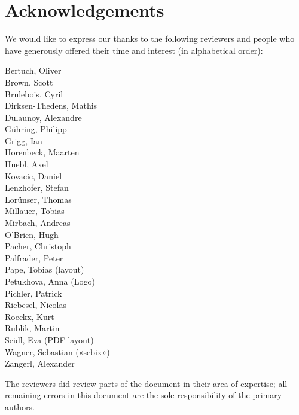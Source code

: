 \clearpage
\section*{Acknowledgements}
\label{section:Reviewers}

We would like to express our thanks to the following reviewers and people who have generously offered their time and interest (in alphabetical order):

\begin{multicols}{2}{\parskip=0pt\centering\obeylines%
Bertuch, Oliver \\
Brown, Scott \\
Brulebois, Cyril \\
Dirksen-Thedens, Mathis \\
Dulaunoy, Alexandre \\
Gühring, Philipp  \\
Grigg, Ian  \\
Horenbeck, Maarten \\
Huebl, Axel \\
Kovacic, Daniel \\
Lenzhofer, Stefan \\
Lorünser, Thomas \\
Millauer, Tobias \\
Mirbach, Andreas \\ 
O'Brien, Hugh \\
Pacher, Christoph \\
Palfrader, Peter \\
Pape, Tobias (layout) \\
Petukhova, Anna (Logo) \\
Pichler, Patrick \\
Riebesel, Nicolas \\
Roeckx, Kurt \\
Rublik, Martin \\
Seidl, Eva (PDF layout) \\
Wagner, Sebastian («sebix») \\
Zangerl, Alexander \\
}\end{multicols}





The reviewers did review parts of the document in their area of
expertise; all remaining errors in this document are the sole
responsibility of the primary authors.





